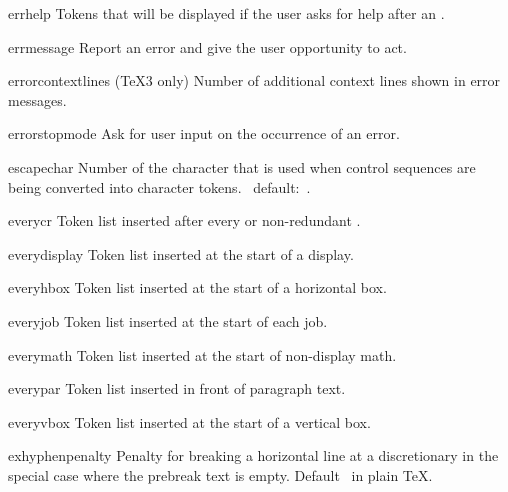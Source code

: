 \item errhelp
      Tokens that will be displayed if the user 
      asks for help after an .

\item errmessage
      Report an error and give the user opportunity to act.

\item errorcontextlines
      (\TeX3 only)
      Number of additional context lines shown in error messages.

\item errorstopmode
      Ask for user input on the occurrence of an error.

\item escapechar 
      Number of the character that is  used 
      when control sequences are being converted
      into character tokens.
      \IniTeX\ default:~.

\item everycr
      Token list inserted after every  or non-redundant .

\item everydisplay
      Token list inserted at the start of a display.

\item everyhbox
      Token list inserted at the start of a horizontal box.

\item everyjob
      Token list inserted at the start of each job.

\item everymath
      Token list inserted at the start of non-display math.

\item everypar
      Token list inserted in front of paragraph text.

\item everyvbox
      Token list inserted at the start of a vertical box.

\item exhyphenpenalty
      Penalty for breaking a horizontal line at a discretionary
      in the special case where the prebreak text is empty. 
      Default~ in plain \TeX.

